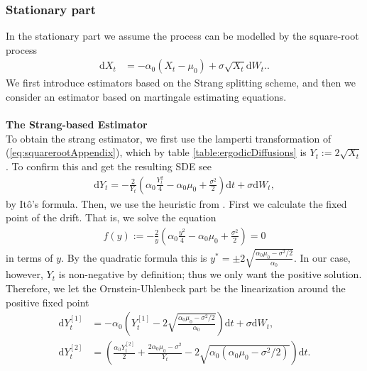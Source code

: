 \subsubsection{Stationary part}\label{subsubsec:squarerootStationary}
In the stationary part we assume the process can be modelled by the square-root process
\begin{align}
    \mathrm{d}X_t &= -\alpha_0\left(X_t - \mu_0\right) + \sigma \sqrt{X_t} \mathrm{d}W_t. \label{eq:squarerootAppendix}.
\end{align}
We first introduce estimators based on the Strang splitting scheme, and then we consider an estimator based on martingale estimating equations.\\\\
\noindent \textbf{The Strang-based Estimator}\\
To obtain the strang estimator, we first use the lamperti transformation of (\ref{eq:squarerootAppendix}), which by table \ref{table:ergodicDiffusions} is $Y_t := 2\sqrt{X_t}$. To confirm this and get the resulting SDE see
\begin{align}
    \mathrm{d}Y_t = - \frac{2}{Y_t}\left(\alpha_0 \frac{Y_t^2}{4} - \alpha_0 \mu_0 + \frac{\sigma^2}{2}\right)\mathrm{d}t + \sigma \mathrm{d}W_t, \label{eq:lampertiSquarerootAppendix}
\end{align}
by Itô's formula. Then, we use the heuristic from \cite[section 2.3 and 2.5]{SplittingSchemes}. First we calculate the fixed point of the drift. That is, we solve the equation
\begin{align}
    f(y) := - \frac{2}{y}\left(\alpha_0 \frac{y^2}{4} - \alpha_0 \mu_0 + \frac{\sigma^2}{2}\right) = 0
\end{align}
in terms of $y$. By the quadratic formula this is $y^* = \pm 2\sqrt{\frac{\alpha_0\mu_0 - \sigma^2 / 2}{\alpha_0}}$. In our case, however, $Y_t$ is non-negative by definition; thus we only want the positive solution. Therefore, we let the Ornstein-Uhlenbeck part be the linearization around the positive fixed point
\begin{align}
    \mathrm{d}Y_t^{[1]} &= -\alpha_0 \left(Y_t^{[1]} - 2\sqrt{\frac{\alpha_0\mu_0 - \sigma^2 / 2}{\alpha_0}}\right)\mathrm{d}t + \sigma \mathrm{d}W_t , \label{eq:squarerootStationarySplit1} \\
    \mathrm{d}Y_t^{[2]} &= \left(\frac{\alpha_0 Y_t^{[2]}}{2} + \frac{2\alpha_0 \mu_0 - \sigma^2}{Y_t} - 2\sqrt{\alpha_0\left(\alpha_0\mu_0 - \sigma^2 / 2\right)}\right)\mathrm{d}t. \label{eq:squarerootStationarySplit2}
\end{align}
